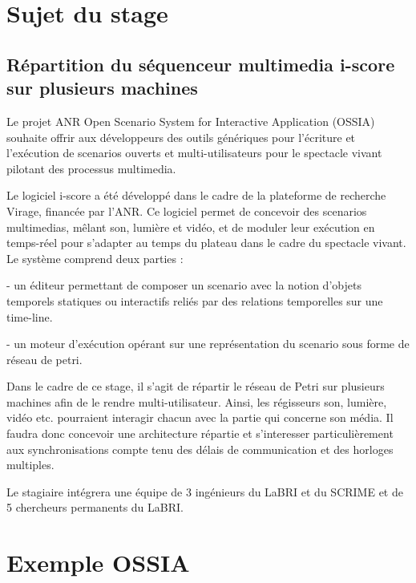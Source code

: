 \begin{appendices}
	\chapter{Sujet du stage}
	\label{apx.SujetStage}
	\section*{Répartition du séquenceur multimedia i-score sur plusieurs machines}
	
	Le projet ANR Open Scenario System for Interactive Application (OSSIA)
	souhaite offrir aux développeurs des outils génériques pour l'écriture
	et l'exécution de scenarios ouverts et multi-utilisateurs pour le
	spectacle vivant pilotant des processus multimedia.
	
	Le logiciel i-score a été développé dans le cadre de la plateforme de
	recherche Virage, financée par l'ANR. Ce logiciel permet de concevoir
	des scenarios multimedias, mêlant son, lumière et vidéo, et de moduler
	leur exécution en temps-réel pour s'adapter au temps du plateau dans
	le cadre du spectacle vivant. Le système comprend deux parties :
	
	- un éditeur permettant de composer un scenario avec la notion
	d'objets temporels statiques ou interactifs reliés par des relations
	temporelles sur une time-line.
	
	- un moteur d'exécution opérant sur une représentation du scenario
	sous forme de réseau de petri.
	
	Dans le cadre de ce stage, il s'agit de répartir le réseau de Petri
	sur plusieurs machines afin de le rendre multi-utilisateur. Ainsi, les
	régisseurs son, lumière, vidéo etc. pourraient interagir chacun avec
	la partie qui concerne son média. Il faudra donc concevoir une
	architecture répartie et s'interesser particulièrement aux
	synchronisations compte tenu des délais de communication et des
	horloges multiples.
	
	Le stagiaire intégrera une équipe de 3 ingénieurs du LaBRI et du
	SCRIME et de 5 chercheurs permanents du LaBRI.
	
	\chapter{Exemple OSSIA}
	\label{apx.OSSIAExemple}
	
\end{appendices}